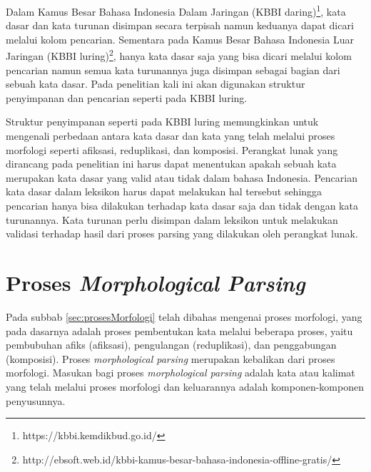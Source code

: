 Dalam Kamus Besar Bahasa Indonesia Dalam Jaringan (KBBI daring)\footnote{https://kbbi.kemdikbud.go.id/}, kata dasar dan kata turunan disimpan secara terpisah namun keduanya dapat dicari melalui kolom pencarian. Sementara pada Kamus Besar Bahasa Indonesia Luar Jaringan (KBBI luring)\footnote{http://ebsoft.web.id/kbbi-kamus-besar-bahasa-indonesia-offline-gratis/}, hanya kata dasar saja yang bisa dicari melalui kolom pencarian namun semua kata turunannya juga disimpan sebagai bagian dari sebuah kata dasar. Pada penelitian kali ini akan digunakan struktur penyimpanan dan pencarian seperti pada KBBI luring.

Struktur penyimpanan seperti pada KBBI luring memungkinkan untuk mengenali perbedaan antara kata dasar dan kata yang telah melalui proses morfologi seperti afiksasi, reduplikasi, dan komposisi. Perangkat lunak yang dirancang pada penelitian ini harus dapat menentukan apakah sebuah kata merupakan kata dasar yang valid atau tidak dalam bahasa Indonesia. Pencarian kata dasar dalam leksikon harus dapat melakukan hal tersebut sehingga pencarian hanya bisa dilakukan terhadap kata dasar saja dan tidak dengan kata turunannya. Kata turunan perlu disimpan dalam leksikon untuk melakukan validasi terhadap hasil dari proses parsing yang dilakukan oleh perangkat lunak. %


\section{Proses \textit{Morphological Parsing}}
\label{sec:morphologicalParsing}

Pada subbab \ref{sec:prosesMorfologi} telah dibahas mengenai proses morfologi, yang pada dasarnya adalah proses pembentukan kata melalui beberapa proses, yaitu pembubuhan afiks (afiksasi), pengulangan (reduplikasi), dan penggabungan (komposisi). Proses \textit{morphological parsing} merupakan kebalikan dari proses morfologi. Masukan bagi proses \textit{morphological parsing} adalah kata atau kalimat yang telah melalui proses morfologi dan keluarannya adalah komponen-komponen penyusunnya.

